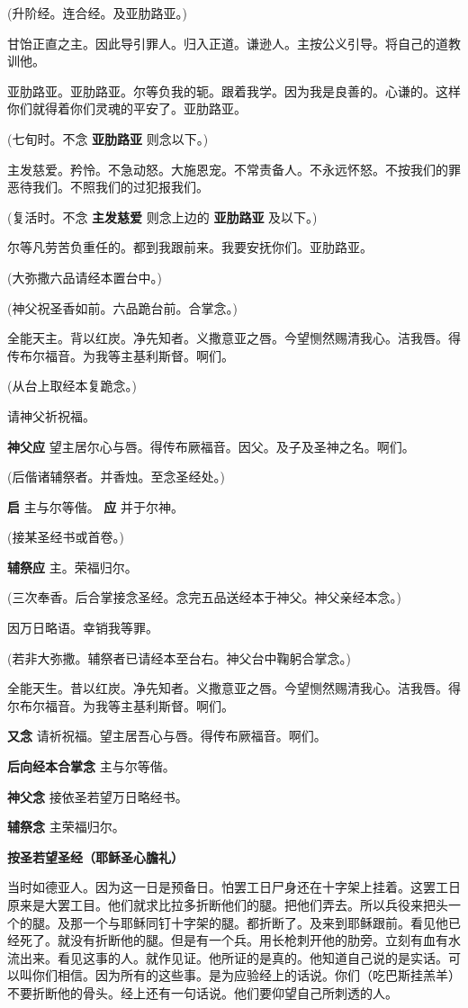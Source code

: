 \documentclass[UTF8,17pt]{ctexart}
\begin{document}
(升阶经。连合经。及亚肋路亚。)

⽢饴正直之主。因此导引罪⼈。归⼊正道。谦逊⼈。主按公义引导。将⾃⼰的道教训他。

亚肋路亚。亚肋路亚。尔等负我的轭。跟着我学。因为我是良善的。⼼谦的。这样你们就得着你们灵魂的平安了。亚肋路亚。

(七旬时。不念 \textbf{亚肋路亚} 则念以下。)

主发慈爱。矜怜。不急动怒。⼤施恩宠。不常责备⼈。不永远怀怒。不按我们的罪恶待我们。不照我们的过犯报我们。

(复活时。不念 \textbf{主发慈爱} 则念上边的 \textbf{亚肋路亚} 及以下。)

尔等凡劳苦负重任的。都到我跟前来。我要安抚你们。亚肋路亚。

(⼤弥撒六品请经本置台中。)

(神⽗祝圣⾹如前。六品跪台前。合掌念。)

全能天主。背以红炭。净先知者。义撒意亚之唇。今望恻然赐清我⼼。洁我唇。得传布尔福⾳。为我等主基利斯督。啊们。

(从台上取经本复跪念。)

请神⽗祈祝福。

\textbf{神父应} \quad 望主居尔⼼与唇。得传布厥福⾳。因⽗。及⼦及圣神之名。啊们。

(后偕诸辅祭者。并⾹烛。⾄念圣经处。)

\textbf{启} \quad 主与尔等偕。 \quad \quad \quad \textbf{应} \quad 并于尔神。

(接某圣经书或⾸卷。)

\textbf{辅祭应} \quad 主。荣福归尔。

(三次奉⾹。后合掌接念圣经。念完五品送经本于神⽗。神⽗亲经本念。)

因万⽇略语。幸销我等罪。

(若⾮⼤弥撒。辅祭者已请经本⾄台右。神⽗台中鞠躬合掌念。)

全能天⽣。昔以红炭。净先知者。义撒意亚之唇。今望恻然赐清我⼼。洁我唇。得尔布尔福⾳。为我等主基利斯督。啊们。

\textbf{又念} \quad 请祈祝福。望主居吾⼼与唇。得传布厥福⾳。啊们。

\textbf{后向经本合掌念} \quad 主与尔等偕。

\textbf{神⽗念} \quad 接依圣若望万⽇略经书。

\textbf{辅祭念} \quad 主荣福归尔。

\textbf{按圣若望圣经（耶稣圣⼼膽礼）}

当时如德亚⼈。因为这⼀⽇是预备⽇。怕罢⼯日⼫⾝还在⼗字架上挂着。这罢⼯⽇原来是⼤罢⼯⽬。他们就求⽐拉多折断他们的腿。把他们弄去。所以兵役来把头⼀个的腿。及那⼀个与耶稣同钉⼗字架的腿。都折断了。及来到耶稣跟前。看见他已经死了。就没有折断他的腿。但是有⼀个兵。⽤长枪刺开他的肋旁。⽴刻有⾎有⽔流出来。看见这事的⼈。就作见证。他所证的是真的。他知道⾃⼰说的是实话。可以叫你们相信。因为所有的这些事。是为应验经上的话说。你们（吃巴斯挂羔⽺）不要折断他的⾻头。经上还有⼀句话说。他们要仰望⾃⼰所刺透的⼈。
\end{document}
